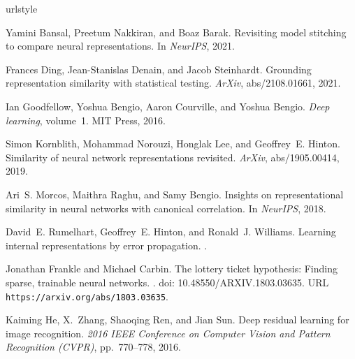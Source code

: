\documentclass{article}
\begin{document}
\small
\begin{thebibliography}{6}
  \providecommand{\natexlab}[1]{#1}
  \providecommand{\url}[1]{\texttt{#1}}
  \expandafter\ifx\csname urlstyle\endcsname\relax
    \providecommand{\doi}[1]{doi: #1}\else
    \providecommand{\doi}{doi: \begingroup \urlstyle{rm}\Url}\fi
  
  Yamini Bansal, Preetum Nakkiran, and Boaz Barak.
  \newblock Revisiting model stitching to compare neural representations.
  \newblock In \emph{NeurIPS}, 2021.
  
  Frances Ding, Jean-Stanislas Denain, and Jacob Steinhardt.
  \newblock Grounding representation similarity with statistical testing.
  \newblock \emph{ArXiv}, abs/2108.01661, 2021.
  
  Ian Goodfellow, Yoshua Bengio, Aaron Courville, and Yoshua Bengio.
  \newblock \emph{Deep learning}, volume~1.
  \newblock MIT Press, 2016.
  
  Simon Kornblith, Mohammad Norouzi, Honglak Lee, and Geoffrey~E. Hinton.
  \newblock Similarity of neural network representations revisited.
  \newblock \emph{ArXiv}, abs/1905.00414, 2019.
  
  Ari~S. Morcos, Maithra Raghu, and Samy Bengio.
  \newblock Insights on representational similarity in neural networks with
    canonical correlation.
  \newblock In \emph{NeurIPS}, 2018.
  
  David~E. Rumelhart, Geoffrey~E. Hinton, and Ronald~J. Williams.
  \newblock Learning internal representations by error propagation.
  .

  Jonathan Frankle and Michael Carbin.
  \newblock The lottery ticket hypothesis: Finding sparse, trainable neural
    networks.
  .
  \newblock \doi{10.48550/ARXIV.1803.03635}.
  \newblock URL \url{https://arxiv.org/abs/1803.03635}.

  Kaiming He, X.~Zhang, Shaoqing Ren, and Jian Sun.
  \newblock Deep residual learning for image recognition.
  \newblock \emph{2016 IEEE Conference on Computer Vision and Pattern Recognition
    (CVPR)}, pp.\  770--778, 2016.

  \end{thebibliography}
\newpage
\appendix
\end{document}

